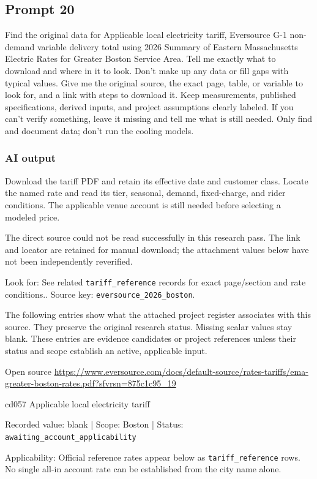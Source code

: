 \subsection*{Prompt 20}
Find the original data for Applicable local electricity tariff, Eversource G-1 non-demand variable delivery total using 2026 Summary of Eastern Massachusetts Electric Rates for Greater Boston Service Area. Tell me exactly what to download and where in it to look. Don’t make up any data or fill gaps with typical values. Give me the original source, the exact page, table, or variable to look for, and a link with steps to download it. Keep measurements, published specifications, derived inputs, and project assumptions clearly labeled. If you can’t verify something, leave it missing and tell me what is still needed. Only find and document data; don’t run the cooling models.

\subsubsection*{AI output}
Download the tariff PDF and retain its effective date and customer class. Locate the named rate and read its tier, seasonal, demand, fixed-charge, and rider conditions. The applicable venue account is still needed before selecting a modeled price.

The direct source could not be read successfully in this research pass. The link and locator are retained for manual download; the attachment values below have not been independently reverified.

Look for: See related \nolinkurl{tariff_reference} records for exact page/section and rate conditions.. Source key: \nolinkurl{eversource_2026_boston}.

The following entries show what the attached project register associates with this source. They preserve the original research status. Missing scalar values stay blank. These entries are evidence candidates or project references unless their status and scope establish an active, applicable input.

Open source  \url{https://www.eversource.com/docs/default-source/rates-tariffs/ema-greater-boston-rates.pdf?sfvrsn=875c1c95_19}

cd057  Applicable local electricity tariff

Recorded value: blank | Scope: Boston | Status: \nolinkurl{awaiting_account_applicability}

Applicability: Official reference rates appear below as \nolinkurl{tariff_reference} rows. No single all-in account rate can be established from the city name alone.

